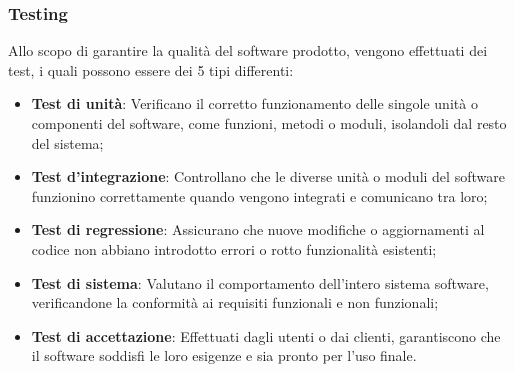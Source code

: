 \subsubsection{Testing}
Allo scopo di garantire la qualità del software prodotto, vengono effettuati dei test, i quali possono essere dei 5 tipi differenti:
\begin{itemize}
    \item \textbf{Test di unità}: Verificano il corretto funzionamento delle singole unità o componenti del software, come funzioni, metodi o moduli, isolandoli dal resto del sistema;
    \item \textbf{Test d'integrazione}: Controllano che le diverse unità o moduli del software funzionino correttamente quando vengono integrati e comunicano tra loro;
    \item \textbf{Test di regressione}: Assicurano che nuove modifiche o aggiornamenti al codice non abbiano introdotto errori o rotto funzionalità esistenti;
    \item \textbf{Test di sistema}: Valutano il comportamento dell'intero sistema software, verificandone la conformità ai requisiti funzionali e non funzionali;
    \item \textbf{Test di accettazione}: Effettuati dagli utenti o dai clienti, garantiscono che il software soddisfi le loro esigenze e sia pronto per l'uso finale.
\end{itemize}

